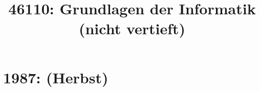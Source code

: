 \documentclass{lehramt-informatik-haupt}
\title{46110: Grundlagen der Informatik (nicht vertieft)}
\begin{document}
\maketitle
\tableofcontents

\section{1987: (Herbst)}

\end{document}
